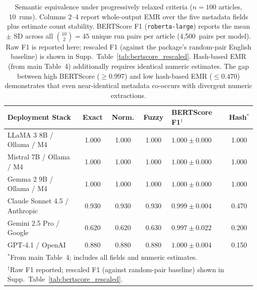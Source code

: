 \documentclass[11pt]{article}
\newenvironment{fittab}{\begin{lrbox}{\fittabbox}}{\end{lrbox}%
  \ifdim\wd\fittabbox>\linewidth\resizebox{\linewidth}{!}{\usebox{\fittabbox}}\else\usebox{\fittabbox}\fi}
\begin{document}
\begin{table}[htbp]
\centering
\caption{Semantic equivalence under progressively relaxed criteria ($n\!=\!100$ articles, 10~runs). Columns 2--4 report whole-output EMR over the five metadata fields plus estimate count stability. BERTScore F1 (\texttt{roberta-large}) reports the mean $\pm$ SD across all $\binom{10}{2}{=}45$ unique run pairs per article (4,500~pairs per model). Raw F1 is reported here; rescaled F1 (against the package's random-pair English baseline) is shown in Supp.~Table~\ref{tab:bertscore_rescaled}. Hash-based EMR (from main Table~4) additionally requires identical numeric estimates. The gap between high BERTScore (${\geq}0.997$) and low hash-based EMR (${\leq}0.470$) demonstrates that even near-identical metadata co-occurs with divergent numeric extractions.}
\label{tab:semantic}
\begin{fittab}\begin{tabular}{lccclc}
\toprule
\textbf{Deployment Stack} & \textbf{Exact} & \textbf{Norm.} & \textbf{Fuzzy} & \textbf{BERTScore F1$^{\dagger}$} & \textbf{Hash}$^{*}$ \\
\midrule
LLaMA 3 8B / Ollama / M4       & 1.000 & 1.000 & 1.000 & $1.000 \pm 0.000$ & 1.000 \\
Mistral 7B / Ollama / M4       & 1.000 & 1.000 & 1.000 & $1.000 \pm 0.000$ & 1.000 \\
Gemma 2 9B / Ollama / M4       & 1.000 & 1.000 & 1.000 & $1.000 \pm 0.000$ & 1.000 \\
\midrule
Claude Sonnet 4.5 / Anthropic  & 0.930 & 0.930 & 0.930 & $0.999 \pm 0.004$ & 0.470 \\
Gemini 2.5 Pro / Google        & 0.620 & 0.620 & 0.630 & $0.997 \pm 0.022$ & 0.200 \\
GPT-4.1 / OpenAI               & 0.880 & 0.880 & 0.880 & $1.000 \pm 0.004$ & 0.150 \\
\bottomrule
\multicolumn{6}{l}{\footnotesize $^{*}$From main Table~4; includes all fields and numeric estimates.}\\
\multicolumn{6}{l}{\footnotesize $^{\dagger}$Raw F1 reported; rescaled F1 (against random-pair baseline) shown in Supp.~Table~\ref{tab:bertscore_rescaled}.}
\end{tabular}\end{fittab}
\end{table}
\end{document}

